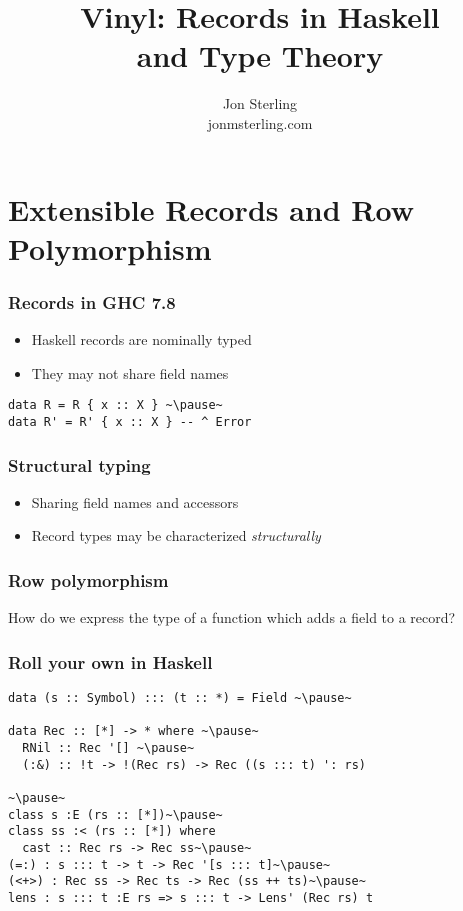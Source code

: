 \documentclass[tikz, 12pt]{beamer}
\title{Vinyl: Records in Haskell \\ and Type Theory}
\author{Jon Sterling\\
  jonmsterling.com
}
\begin{document}
\begin{frame}
\titlepage
\end{frame}

\section{Extensible Records and Row Polymorphism}

\begin{frame}[fragile]
  \frametitle{Records in GHC 7.8}\pause
  \begin{itemize}
    \item Haskell records are nominally typed\pause
    \item They may not share field names
  \end{itemize}
  \pause
  \begin{lstlisting}
data R = R { x :: X } ~\pause~
data R' = R' { x :: X } -- ^ Error
  \end{lstlisting}
\end{frame}

\begin{frame}
  \frametitle{Structural typing}\pause
  \begin{itemize}
    \item Sharing field names and accessors\pause
    \item Record types may be characterized \emph{structurally}
  \end{itemize}
\end{frame}

\begin{frame}
  \frametitle{Row polymorphism}\pause
  How do we express the type of a function which adds a field to a record?\pause
\end{frame}

\begin{frame}[fragile]
  \frametitle{Roll your own in Haskell}\pause
  \begin{lstlisting}
data (s :: Symbol) ::: (t :: *) = Field ~\pause~

data Rec :: [*] -> * where ~\pause~
  RNil :: Rec '[] ~\pause~
  (:&) :: !t -> !(Rec rs) -> Rec ((s ::: t) ': rs)

~\pause~
class s :E (rs :: [*])~\pause~
class ss :< (rs :: [*]) where
  cast :: Rec rs -> Rec ss~\pause~
(=:) : s ::: t -> t -> Rec '[s ::: t]~\pause~
(<+>) : Rec ss -> Rec ts -> Rec (ss ++ ts)~\pause~
lens : s ::: t :E rs => s ::: t -> Lens' (Rec rs) t
  \end{lstlisting}
\end{frame}
\end{document}
